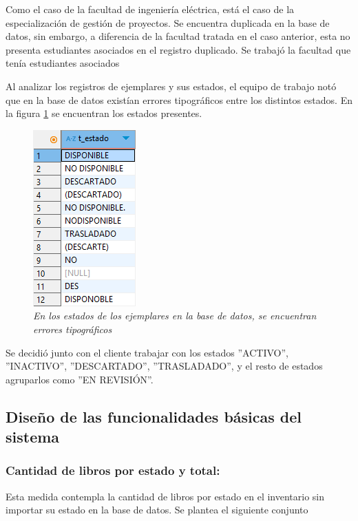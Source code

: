 \documentclass[spanish]{ieee_upb}
\begin{document}
\vspace{0.3cm}
Como el caso de la facultad de ingeniería eléctrica, está el caso de la especialización de gestión de proyectos. Se encuentra duplicada en la base de datos, sin embargo, a diferencia de la facultad tratada en el caso anterior, esta no presenta estudiantes asociados en el registro duplicado. Se trabajó la facultad que tenía estudiantes asociados

\vspace{0.3cm}
Al analizar los registros de ejemplares y sus estados, el equipo de trabajo notó que en la base de datos existían errores tipográficos entre los distintos estados. En la figura \ref{fig:problemas-2} se encuentran los estados presentes.

 \begin{figure}[H] 
	\centering
	\includegraphics[width=0.2\linewidth]{img/variedades/bd-problemas2.png}
	\vspace{-1mm}
	\caption[Caso 2: Errores tipográficos en la base de datos]{\textit{En los estados de los ejemplares en la base de datos, se encuentran errores tipográficos}}
	\label{fig:problemas-2} 
\end{figure}

Se decidió junto con el cliente trabajar con los estados ''ACTIVO'', ''INACTIVO'', ''DESCARTADO'', ''TRASLADADO'', y el resto de estados agruparlos como ''EN REVISIÓN''. 


\subsection{Diseño de las funcionalidades básicas del sistema }

\subsubsection{Cantidad de libros por estado y total: }

Esta medida contempla la cantidad de libros por estado en el inventario sin importar su estado en la base de datos. Se plantea el siguiente conjunto
\end{document}
